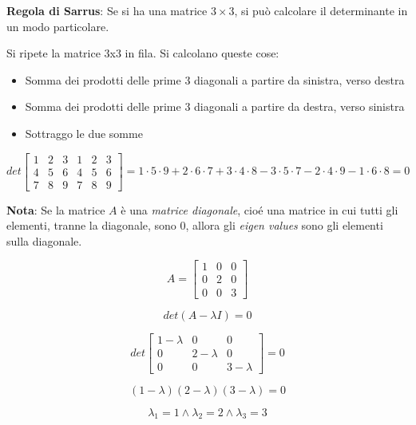 \begin{domanda}
    \textbf{Regola di Sarrus}: Se si ha una matrice $3 \times 3$, si può calcolare il determinante
    in un modo particolare.

    Si ripete la matrice 3x3 in fila. Si calcolano queste cose:
    \begin{itemize}
        \item Somma dei prodotti delle prime 3 diagonali a partire da sinistra, verso destra
        \item Somma dei prodotti delle prime 3 diagonali a partire da destra, verso sinistra
        \item Sottraggo le due somme
    \end{itemize}

    \begin{esempio}
        $$
            det\begin{bmatrix}
                1 & 2 & 3 & 1 & 2 & 3 \\
                4 & 5 & 6 & 4 & 5 & 6 \\
                7 & 8 & 9 & 7 & 8 & 9
            \end{bmatrix} = 1 \cdot 5 \cdot 9 + 2 \cdot 6 \cdot 7 + 3 \cdot 4 \cdot 8 - 3 \cdot 5 \cdot 7 - 2 \cdot 4 \cdot 9 - 1 \cdot 6 \cdot 8 = 0
        $$
    \end{esempio}
\end{domanda}

\textbf{Nota}: Se la matrice $A$ è una \textit{matrice diagonale}, cioé
una matrice in cui tutti gli elementi, tranne la diagonale, sono $0$, allora
gli \textit{eigen values} sono gli elementi sulla diagonale.

$$
    A = \begin{bmatrix}
        1 & 0 & 0 \\
        0 & 2 & 0 \\
        0 & 0 & 3
    \end{bmatrix}
$$

$$
    det(A - \lambda I) = 0
$$

$$
    det\begin{bmatrix}
        1 - \lambda & 0            & 0            \\
        0           & 2 - \lambda  & 0            \\
        0           & 0            & 3 - \lambda
    \end{bmatrix} = 0
$$

$$
    (1 - \lambda)(2 - \lambda)(3 - \lambda) = 0
$$

$$
    \lambda_1 = 1 \land \lambda_2 = 2 \land \lambda_3 = 3
$$

